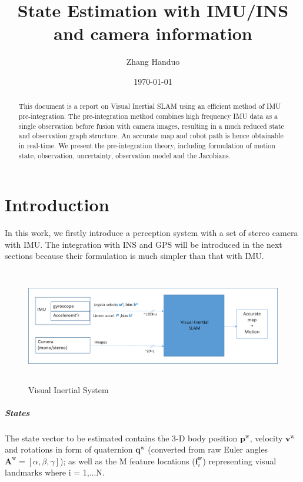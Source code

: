 \documentclass[12pt]{report}   %
\begin{document}


\title{State Estimation with IMU/INS and camera information}
\author{Zhang Handuo}
\date{\today}

\maketitle

\begin{abstract}
This document is a report on Visual Inertial SLAM using an efficient method of
IMU pre-integration. The pre-integration method combines high frequency IMU data
as a single observation before fusion with camera images, resulting in a much
reduced state and observation graph structure. An accurate map and robot path is
hence obtainable in real-time. We present the pre-integration theory, including
formulation of motion state, observation, uncertainty, observation model and the
Jacobians.
\end{abstract}

\newpage

\tableofcontents

\newpage

\chapter{Introduction}

\vspace{1cm}
In this work, we firstly introduce a perception system with a set of stereo
camera with IMU. The integration with INS and GPS will be introduced in the next
sections because their formulation is much simpler than that with IMU.
\begin{figure}[ht]
	\includegraphics[height=5cm]{figures/VIN_block-diagram.png}
	\caption{Visual Inertial System}
	\label{fig:vin}
\end{figure}

\paragraph{States}
The state vector to be estimated contains the 3-D body position
$\bm{p}^{\mathrm{w}}$, velocity $\bm{v}^{\mathrm{w}}$ and rotations in form of
quaternion $\bm{q}^{\mathrm{w}}$ (converted from raw Euler angles
$\bm{A}^{\mathrm{w}}=[\alpha,\beta,\gamma]$); as well as the M feature locations
($\bm{f}_i^{\mathrm{w}}$) representing visual landmarks where i = 1,...N. 
\end{document}
